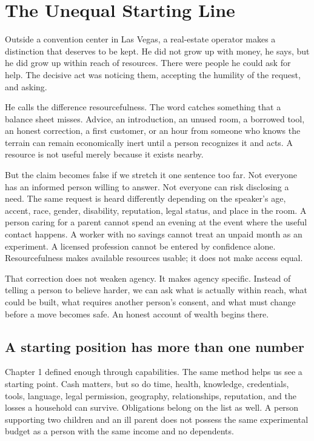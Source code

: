 \chapter{The Unequal Starting Line}

Outside a convention center in Las Vegas, a real-estate operator makes a
distinction that deserves to be kept. He did not grow up with money, he says,
but he did grow up within reach of resources. There were people he could ask
for help. The decisive act was noticing them, accepting the humility of the
request, and asking.

He calls the difference resourcefulness. The word catches something that a
balance sheet misses. Advice, an introduction, an unused room, a borrowed tool,
an honest correction, a first customer, or an hour from someone who knows the
terrain can remain economically inert until a person recognizes it and acts.
A resource is not useful merely because it exists nearby.

But the claim becomes false if we stretch it one sentence too far. Not everyone
has an informed person willing to answer. Not everyone can risk disclosing a
need. The same request is heard differently depending on the speaker's age,
accent, race, gender, disability, reputation, legal status, and place in the
room. A person caring for a parent cannot spend an evening at the event where
the useful contact happens. A worker with no savings cannot treat an unpaid
month as an experiment. A licensed profession cannot be entered by confidence
alone. Resourcefulness makes available resources usable; it does not make
access equal.

That correction does not weaken agency. It makes agency specific. Instead of
telling a person to believe harder, we can ask what is actually within reach,
what could be built, what requires another person's consent, and what must
change before a move becomes safe. An honest account of wealth begins there.

\section{A starting position has more than one number}

Chapter 1 defined enough through capabilities. The same method helps us see a
starting point. Cash matters, but so do time, health, knowledge, credentials,
tools, language, legal permission, geography, relationships, reputation, and
the losses a household can survive. Obligations belong on the list as well. A
person supporting two children and an ill parent does not possess the same
experimental budget as a person with the same income and no dependents.

